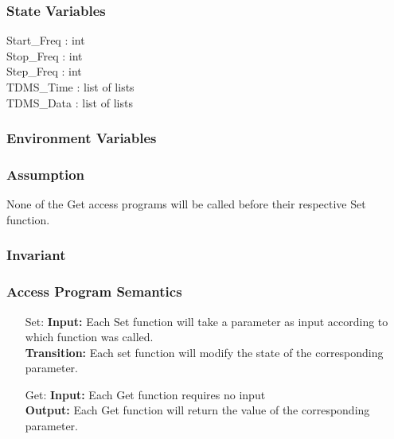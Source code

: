 \documentclass[12pt]{article}
\begin{document}
\subsubsection{State Variables}
Start\_Freq : int\\
Stop\_Freq : int\\
Step\_Freq : int\\
TDMS\_Time : list of lists\\
TDMS\_Data : list of lists\\

  
\subsubsection{Environment Variables}
\subsubsection{Assumption}
None of the Get access programs will be called before their respective
Set function.
\subsubsection{Invariant}
\subsubsection{Access Program Semantics}
\begin{itemize}
\item[Set:]
\textbf{Input:}
Each Set function will take a parameter as input according to which function was 
called.\\
\textbf{Transition:}
Each set function will modify the state of the corresponding parameter.

\item[Get:]
\textbf{Input:}
Each Get function requires no input\\
\textbf{Output:} Each Get function will return the value of the corresponding 
parameter.
\end{itemize}
\end{document}

